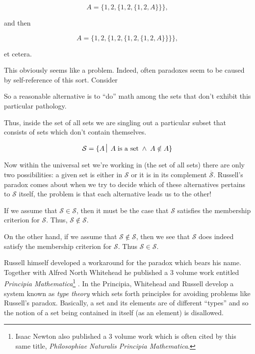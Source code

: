 \[ A = \{ 1, 2, \{ 1, 2, \{ 1, 2, A \} \} \}, \]

\noindent and then

\[ A = \{ 1, 2, \{ 1, 2, \{ 1, 2, \{ 1, 2, A \} \} \} \}, \]
  
\noindent et cetera.

This obviously seems like a problem.  Indeed, often paradoxes seem to
be caused by self-reference of this sort.  Consider 

\begin{center} 
\end{center}

So a reasonable alternative
is to ``do'' math among the sets that don't exhibit this particular
pathology.  

Thus, inside the set of all sets we are singling out a particular subset
that consists of sets which don't contain themselves.  

\[ {\mathcal S} = \{ A \suchthat \; A \; \mbox{is a set} \; \land \; A \notin A \} \]

Now within the universal set we're working in (the set of all sets) there
are only two possibilities: a given set is either in ${\mathcal S}$ or
it is in its complement $\overline{\mathcal S}$.  Russell's paradox 
comes about when we try to decide which of these alternatives pertains
to ${\mathcal S}$ itself, the problem is that each alternative leads us 
to the other!

If we assume that ${\mathcal S} \in {\mathcal S}$, then it must be the 
case that ${\mathcal S}$ satisfies the membership criterion for ${\mathcal S}$.
Thus, ${\mathcal S} \notin {\mathcal S}$.

On the other hand, if we assume that ${\mathcal S} \notin {\mathcal S}$,
then we see that ${\mathcal S}$ does indeed satisfy the membership criterion for ${\mathcal S}$.  Thus ${\mathcal S} \in {\mathcal S}$.

Russell himself developed a workaround for the paradox which
bears his name.  Together with Alfred North Whitehead he published
a 3 volume work entitled \emph{Principia Mathematica}\footnote{Isaac Newton
also published a 3 volume work which is often cited by this same title,
\emph{Philosophiae Naturalis Principia Mathematica}.} \cite{PM}.  
In the Principia, Whitehead and Russell develop a system known as 
\emph{type theory} which sets forth principles for avoiding problems
like Russell's paradox.  Basically, a set and its elements are of
different ``types'' and so the notion of a set being contained in itself
(as an element) is disallowed.

\clearpage 




%
%
%



